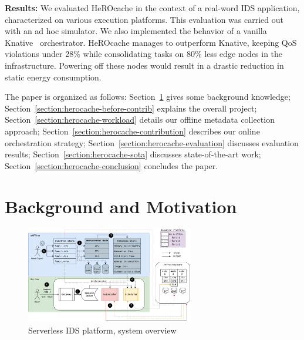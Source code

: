 \textbf{Results:} We evaluated HeROcache in the context of a real-word IDS application, characterized on various execution platforms. This evaluation was carried out with an ad hoc simulator. We also implemented the behavior of a vanilla Knative~\cite{knative} orchestrator. HeROcache manages to outperform Knative, keeping QoS violations under 28\% while consolidating tasks on 80\% less edge nodes in the infrastructure. Powering off these nodes would result in a drastic reduction in static energy consumption.

The paper is organized as follows: Section~\ref{section:herocache-background} gives some background knowledge; Section~\ref{section:herocache-before-contrib} explains the overall project; Section~\ref{section:herocache-workload} details our offline metadata collection approach; Section~\ref{section:herocache-contribution} describes our online orchestration strategy; Section~\ref{section:herocache-evaluation} discusses evaluation results; Section~\ref{section:herocache-sota} discusses state-of-the-art work; Section~\ref{section:herocache-conclusion} concludes the paper.

\section{Background and Motivation}
\label{section:herocache-background}



\begin{figure}[t]
\centering
\includegraphics[width=0.65\textwidth]{6_Chapitre4/figures/serverless-platform-storage.png}
\caption{Serverless IDS platform, system overview}
\label{figure:herocache-serverless-platform}
\end{figure}

